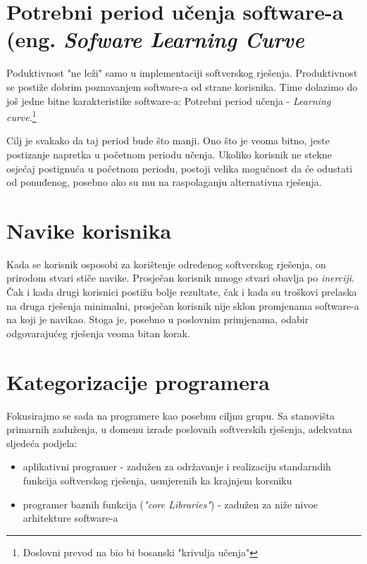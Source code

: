 \documentclass[times, utf8, seminar]{fit}
\begin{document}
\section{Potrebni period učenja software-a (eng. \emph{Sofware Learning Curve}}

Poduktivnost "ne leži" samo u implementaciji softverskog rješenja. Produktivnost se postiže dobrim poznavanjem software-a od strane korisnika. Time dolazimo do još jedne bitne karakteristike software-a: Potrebni period učenja - \emph{Learning curve}.\footnote{Doslovni prevod na bio bi bosanski "krivulja učenja"}

Cilj je svakako da taj period bude što manji. Ono što je veoma bitno, jeste postizanje napretka u početnom periodu učenja. Ukoliko korisnik ne stekne osjećaj postignuća u početnom periodu, postoji velika mogućnost da će odustati od ponuđenog, posebno ako su mu na raspolaganju alternativna rješenja.

\section{Navike korisnika}

Kada se korisnik osposobi za korištenje određenog softverskog rješenja, on prirodom stvari stiče navike. Prosječan korisnik mnoge stvari obavlja po \emph{inerciji}. Čak i kada drugi korisnici postižu bolje rezultate, čak i kada su troškovi prelaska na druga rješenja minimalni, prosječan korisnik nije sklon promjenama software-a na koji je navikao. Stoga je, posebno u poslovnim primjenama, odabir odgovarajućeg rješenja veoma bitan korak.

\section{Kategorizacije programera}

Fokusirajmo se sada na programere kao posebnu ciljnu grupu. Sa stanovišta primarnih zaduženja, u domenu izrade poslovnih softverskih rješenja, adekvatna sljedeća podjela:

\begin{itemize}
  \item aplikativni programer - zadužen za održavanje i realizaciju standarndih funkcija softverskog rješenja, usmjerenih ka krajnjem korsniku 
  \item programer baznih funkcija (\emph{"core Libraries"}) - zadužen za niže nivoe arhitekture software-a
\end{itemize}
\end{document}
